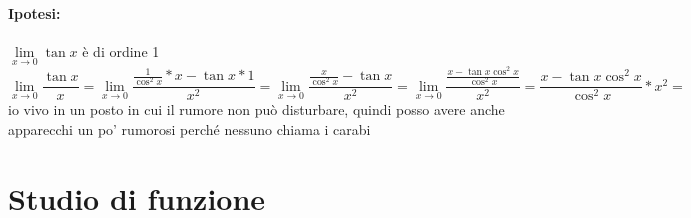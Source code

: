 \paragraph{Ipotesi:} $\lim\limits_{x\to0}\tan x$ è di ordine 1
\begin{equation}
	\lim_{x\to0}\frac{\tan x}{x}=\lim_{x\to0}\frac{\frac{1}{\cos^2x}*x-\tan x*1}{x^2}=\lim_{x\to0}\frac{\frac{x}{\cos^2x}-\tan x}{x^2}=\lim_{x\to0}\frac{\frac{x-\tan x \cos^2x}{\cos^2x}}{x^2}=\frac{x-\tan x \cos^2x}{\cos^2x}*x^2=
\end{equation}io vivo in un posto in cui il rumore non può disturbare, quindi posso avere anche apparecchi un po' rumorosi perché nessuno chiama i carabi

\section{Studio di funzione}
